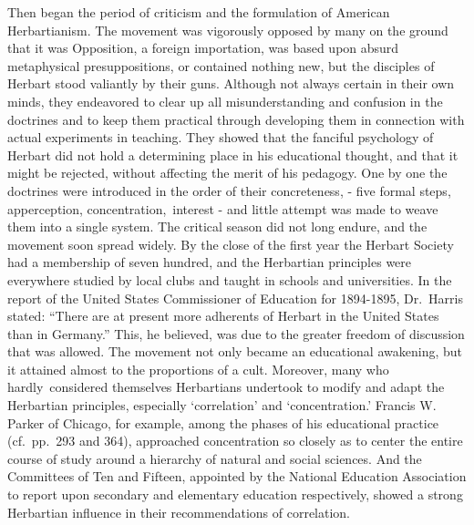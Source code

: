 \documentclass[
]{book}
\begin{document}
Then began the period of criticism and the formulation of American Herbartianism. The movement was vigorously opposed by many on the ground that it was Opposition, a foreign importation, was based upon absurd metaphysical presuppositions, or contained nothing new, but the disciples of Herbart stood valiantly by their guns. Although not always certain in their own minds, they endeavored to clear up all misunderstanding and confusion in the doctrines and to keep them practical through developing them in connection with actual experiments in teaching. They showed that the fanciful psychology of Herbart did not hold a determining place in his educational thought, and that it might be rejected, without affecting the merit of his pedagogy. One by one the doctrines were introduced in the order of their concreteness, - five formal steps, apperception, concentration,~interest - and little attempt was made to weave them into a single system. The critical season did not long endure, and the movement soon spread widely. By the close of the first year the Herbart Society had a membership of seven hundred, and the Herbartian principles were everywhere studied by local clubs and taught in schools and universities. In the report of the United States Commissioner of Education for 1894-1895, Dr.~Harris stated: ``There are at present more adherents of Herbart in the United States than in Germany.'' This, he believed, was due to the greater freedom of discussion that was allowed. The movement not only became an educational awakening, but it attained almost to the proportions of a cult. Moreover, many who hardly~considered themselves Herbartians undertook to modify and adapt the Herbartian principles, especially `correlation' and `concentration.' Francis W. Parker of Chicago, for example, among the phases of his educational practice (cf.~pp.~293 and 364), approached concentration so closely as to center the entire course of study around a hierarchy of natural and social sciences. And the Committees of Ten and Fifteen, appointed by the National Education Association to report upon secondary and elementary education respectively, showed a strong Herbartian influence in their recommendations of correlation.
\end{document}
